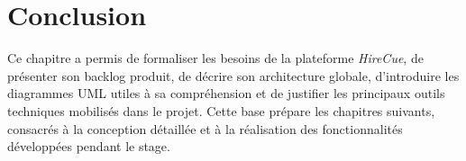 \section*{Conclusion}

Ce chapitre a permis de formaliser les besoins de la plateforme \textit{HireCue}, de présenter son backlog produit, de décrire son architecture globale, d'introduire les diagrammes UML utiles à sa compréhension et de justifier les principaux outils techniques mobilisés dans le projet. Cette base prépare les chapitres suivants, consacrés à la conception détaillée et à la réalisation des fonctionnalités développées pendant le stage.

